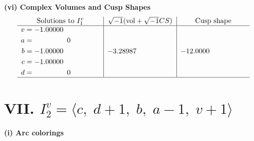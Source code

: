 \documentclass[1p]{elsarticle_modified}
\theoremstyle{definition}
\newcommand{\I}{\sqrt{-1}}
\begin{document}
\newpage\flushleft \textbf{(vi) Complex Volumes and Cusp Shapes}
$$\begin{array}{c|c|c}  
\text{Solutions to }I^v_{1}& \I (\text{vol} + \sqrt{-1}CS) & \text{Cusp shape}\\
 \hline 
\begin{aligned}
v &= -1.00000\phantom{ +0.000000I} \\
a &= \phantom{-0.000000 } 0 \\
b &= -1.00000\phantom{ +0.000000I} \\
c &= -1.00000\phantom{ +0.000000I} \\
d &= \phantom{-0.000000 } 0\end{aligned}
 & -3.28987\phantom{ +0.000000I} & -12.0000\phantom{ +0.000000I}\\
 \hline 
 \end{array}$$\newpage\newpage\renewcommand{\arraystretch}{1}
\centering \section*{VII. $I^v_{2}= \langle c,\;d+1,\;b,\;a-1,\;v+1 \rangle$}
\flushleft \textbf{(i) Arc colorings}\\
\end{document}
